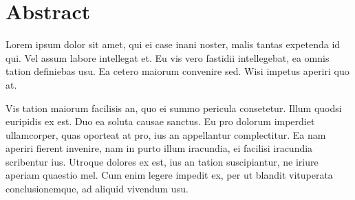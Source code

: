 \section*{Abstract}

Lorem ipsum dolor sit amet, qui ei case inani noster, malis tantas expetenda id qui. Vel assum labore intellegat et. Eu vis vero fastidii intellegebat, ea omnis tation definiebas usu. Ea cetero maiorum convenire sed. Wisi impetus aperiri quo at.

Vis tation maiorum facilisis an, quo ei summo pericula consetetur. Illum quodsi euripidis ex est. Duo ea soluta causae sanctus. Eu pro dolorum imperdiet ullamcorper, quas oporteat at pro, ius an appellantur complectitur. Ea nam aperiri fierent invenire, nam in purto illum iracundia, ei facilisi iracundia scribentur ius. Utroque dolores ex est, ius an tation suscipiantur, ne iriure aperiam quaestio mel. Cum enim legere impedit ex, per ut blandit vituperata conclusionemque, ad aliquid vivendum usu.
